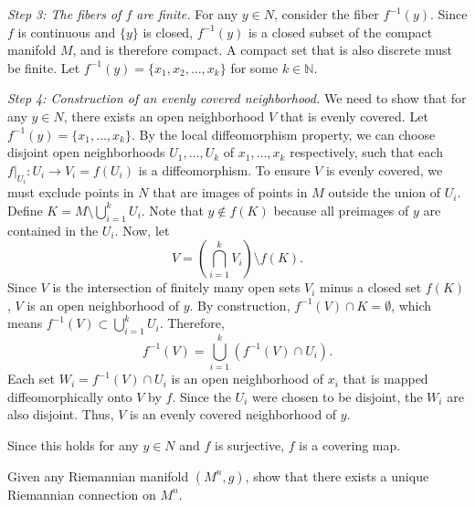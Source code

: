 \begin{solution}
\textit{Step 3: The fibers of $f$ are finite.}
For any $y \in N$, consider the fiber $f^{-1}(y)$. Since $f$ is continuous and $\{y\}$ is closed, $f^{-1}(y)$ is a closed subset of the compact manifold $M$, and is therefore compact.
A compact set that is also discrete must be finite. Let $f^{-1}(y) = \{x_1, x_2, \dots, x_k\}$ for some $k \in \mathbb{N}$.

\textit{Step 4: Construction of an evenly covered neighborhood.}
We need to show that for any $y \in N$, there exists an open neighborhood $V$ that is evenly covered. Let $f^{-1}(y) = \{x_1, \dots, x_k\}$. By the local diffeomorphism property, we can choose disjoint open neighborhoods $U_1, \dots, U_k$ of $x_1, \dots, x_k$ respectively, such that each $f|_{U_i}: U_i \to V_i = f(U_i)$ is a diffeomorphism.
To ensure $V$ is evenly covered, we must exclude points in $N$ that are images of points in $M$ outside the union of $U_i$. Define $K = M \setminus \bigcup_{i=1}^k U_i$.
Note that $y \notin f(K)$ because all preimages of $y$ are contained in the $U_i$. Now, let
\[ V = \left( \bigcap_{i=1}^k V_i \right) \setminus f(K). \]
Since $V$ is the intersection of finitely many open sets $V_i$ minus a closed set $f(K)$, $V$ is an open neighborhood of $y$.
By construction, $f^{-1}(V) \cap K = \emptyset$, which means $f^{-1}(V) \subset \bigcup_{i=1}^k U_i$. Therefore,
\[ f^{-1}(V) = \bigcup_{i=1}^k (f^{-1}(V) \cap U_i). \]
Each set $W_i = f^{-1}(V) \cap U_i$ is an open neighborhood of $x_i$ that is mapped diffeomorphically onto $V$ by $f$. Since the $U_i$ were chosen to be disjoint, the $W_i$ are also disjoint. Thus, $V$ is an evenly covered neighborhood of $y$.

Since this holds for any $y \in N$ and $f$ is surjective, $f$ is a covering map.
\end{solution}

\clearpage

\begin{exercise}
\label{geometry:2012:9}
Given any Riemannian manifold $(M^{n}, g)$, show that there exists a unique Riemannian connection on $M^{n}$.
\end{exercise}

